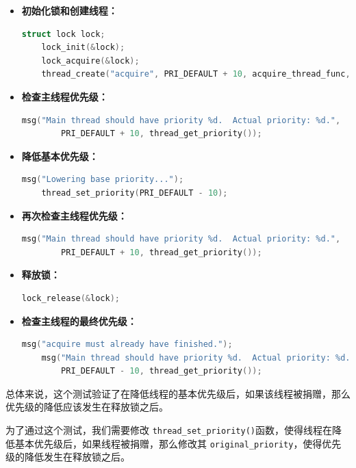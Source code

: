 \documentclass{article}
\begin{document}
\begin{itemize}
  \item \textbf{初始化锁和创建线程：}
        \begin{lstlisting}[language=C]
    struct lock lock;
    lock_init(&lock);
    lock_acquire(&lock);
    thread_create("acquire", PRI_DEFAULT + 10, acquire_thread_func, &lock);
\end{lstlisting}

  \item \textbf{检查主线程优先级：}
        \begin{lstlisting}[language=C]
    msg("Main thread should have priority %d.  Actual priority: %d.",
        PRI_DEFAULT + 10, thread_get_priority());
\end{lstlisting}

  \item \textbf{降低基本优先级：}
        \begin{lstlisting}[language=C]
    msg("Lowering base priority...");
    thread_set_priority(PRI_DEFAULT - 10);
\end{lstlisting}

  \item \textbf{再次检查主线程优先级：}
        \begin{lstlisting}[language=C]
    msg("Main thread should have priority %d.  Actual priority: %d.",
        PRI_DEFAULT + 10, thread_get_priority());
\end{lstlisting}

  \item \textbf{释放锁：}
        \begin{lstlisting}[language=C]
    lock_release(&lock);
\end{lstlisting}

  \item \textbf{检查主线程的最终优先级：}
        \begin{lstlisting}[language=C]
    msg("acquire must already have finished.");
    msg("Main thread should have priority %d.  Actual priority: %d.",
        PRI_DEFAULT - 10, thread_get_priority());
\end{lstlisting}
\end{itemize}

总体来说，这个测试验证了在降低线程的基本优先级后，如果该线程被捐赠，那么优先级的降低应该发生在释放锁之后。

为了通过这个测试，我们需要修改 \texttt{thread\_set\_priority()}函数，使得线程在降低基本优先级后，如果线程被捐赠，那么修改其 \texttt{original\_priority}，使得优先级的降低发生在释放锁之后。
\end{document}
